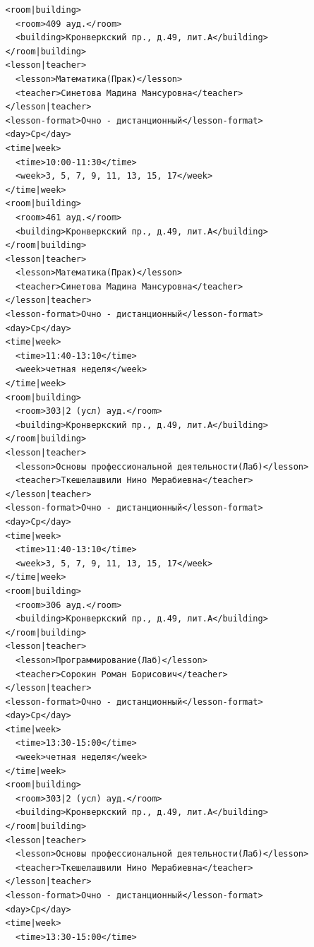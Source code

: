 \documentclass[12pt,onecolumn]{article}
\begin{document}
\begin{flushleft}
\begin{verbatim}
          <room|building>
            <room>409 ауд.</room>
            <building>Кронверкский пр., д.49, лит.А</building>
          </room|building>
          <lesson|teacher>
            <lesson>Математика(Прак)</lesson>
            <teacher>Синетова Мадина Мансуровна</teacher>
          </lesson|teacher>
          <lesson-format>Очно - дистанционный</lesson-format>
          <day>Ср</day>
          <time|week>
            <time>10:00-11:30</time>
            <week>3, 5, 7, 9, 11, 13, 15, 17</week>
          </time|week>
          <room|building>
            <room>461 ауд.</room>
            <building>Кронверкский пр., д.49, лит.А</building>
          </room|building>
          <lesson|teacher>
            <lesson>Математика(Прак)</lesson>
            <teacher>Синетова Мадина Мансуровна</teacher>
          </lesson|teacher>
          <lesson-format>Очно - дистанционный</lesson-format>
          <day>Ср</day>
          <time|week>
            <time>11:40-13:10</time>
            <week>четная неделя</week>
          </time|week>
          <room|building>
            <room>303|2 (усл) ауд.</room>
            <building>Кронверкский пр., д.49, лит.А</building>
          </room|building>
          <lesson|teacher>
            <lesson>Основы профессиональной деятельности(Лаб)</lesson>
            <teacher>Ткешелашвили Нино Мерабиевна</teacher>
          </lesson|teacher>
          <lesson-format>Очно - дистанционный</lesson-format>
          <day>Ср</day>
          <time|week>
            <time>11:40-13:10</time>
            <week>3, 5, 7, 9, 11, 13, 15, 17</week>
          </time|week>
          <room|building>
            <room>306 ауд.</room>
            <building>Кронверкский пр., д.49, лит.А</building>
          </room|building>
          <lesson|teacher>
            <lesson>Программирование(Лаб)</lesson>
            <teacher>Сорокин Роман Борисович</teacher>
          </lesson|teacher>
          <lesson-format>Очно - дистанционный</lesson-format>
          <day>Ср</day>
          <time|week>
            <time>13:30-15:00</time>
            <week>четная неделя</week>
          </time|week>
          <room|building>
            <room>303|2 (усл) ауд.</room>
            <building>Кронверкский пр., д.49, лит.А</building>
          </room|building>
          <lesson|teacher>
            <lesson>Основы профессиональной деятельности(Лаб)</lesson>
            <teacher>Ткешелашвили Нино Мерабиевна</teacher>
          </lesson|teacher>
          <lesson-format>Очно - дистанционный</lesson-format>
          <day>Ср</day>
          <time|week>
            <time>13:30-15:00</time>

\end{verbatim}
\end{flushleft}
\end{document}
